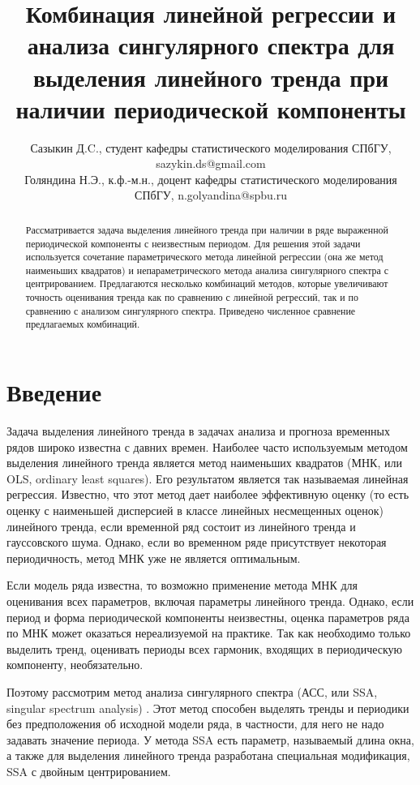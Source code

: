 \documentclass{spisok-article}
\title{Комбинация линейной регрессии и анализа сингулярного спектра для выделения линейного тренда при наличии периодической компоненты
}
\author{Сазыкин Д.C., студент кафедры статистического моделирования СПбГУ, sazykin.ds@gmail.com\\
  Голяндина Н.Э., к.ф.-м.н., доцент кафедры статистического моделирования СПбГУ, n.golyandina@spbu.ru
  }
\begin{document}
\maketitle

\begin{abstract}
Рассматривается задача выделения линейного тренда при наличии в ряде выраженной периодической компоненты с неизвестным периодом.
Для решения этой задачи используется сочетание параметрического метода линейной регрессии (она же метод наименьших квадратов) и непараметрического
метода анализа сингулярного спектра с центрированием. Предлагаются несколько комбинаций методов, которые увеличивают
точность оценивания тренда как по сравнению с линейной регрессий, так и по сравнению с анализом сингулярного спектра.
Приведено численное сравнение предлагаемых комбинаций.
\end{abstract}

\section{Введение}

Задача выделения линейного тренда в задачах анализа и прогноза временных рядов
широко известна с давних времен. Наиболее часто используемым методом выделения линейного тренда является
метод наименьших квадратов (МНК, или OLS, ordinary least squares).
Его результатом является так называемая линейная регрессия. Известно, что этот метод дает наиболее эффективную оценку (то есть оценку с наи­меньшей дисперсией в классе линейных несмещенных оценок) линейного тренда, ес­ли временной ряд состоит из линейного тренда и гауссовского шума.
Однако, если во временном ряде присутствует некоторая периодичность, метод МНК уже не является оптимальным.

Если модель ряда известна, то  возможно применение метода МНК для оценивания всех параметров, включая параметры линейного
тренда.
Однако, если период и форма периодической компоненты неизвестны, оценка параметров ряда по МНК может
оказаться нереализуемой на практике.
Так как необходимо только выделить тренд, оценивать периоды всех гармоник, входящих в периодическую компоненту,
необязательно.

Поэтому рассмотрим метод анализа сингулярного спектра (АСС, или SSA, singular spectrum analysis) \cite{Golyandina.etal2001}. Этот метод способен
выделять тренды и периодики без предположения об исходной модели ряда, в частности, для него не надо задавать
значение периода. У метода SSA есть параметр, называемый длина окна, а также для выделения линейного тренда
разработана специальная модификация, SSA с двойным центрированием.
\end{document}
